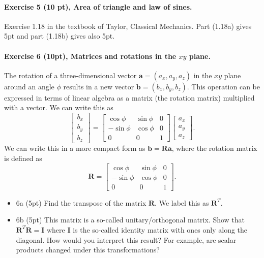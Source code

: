 \documentclass[%
oneside,                 %
final,                   %
10pt]{article}
\begin{document}
\noindent
\paragraph{Exercise 5 (10 pt), Area of triangle and law of sines.}
Exercise 1.18 in the textbook of Taylor, Classical Mechanics. Part (1.18a) gives 5pt and part (1.18b) gives also 5pt.

\paragraph{Exercise 6 (10pt), Matrices and rotations in the $xy$ plane.}
The rotation of a three-dimensional  vector $\bm{a}=(a_x,a_y,a_z)$ in the $xy$ plane around an angle $\phi$ results in a new vector $\bm{b}=(b_x,b_y,b_z)$.  This operation can be expressed in terms of linear algebra as a matrix (the rotation matrix) multiplied with a vector. We can write this as
\[
\begin{bmatrix} b_x \\ b_y \\ b_z \end{bmatrix} = \begin{bmatrix} \cos{\phi} & \sin{\phi} & 0 \\ -\sin{\phi} & \cos{\phi} & 0 \\ 0 & 0 & 1\end{bmatrix}\begin{bmatrix} a_x \\ a_y \\ a_z \end{bmatrix}.
\]
We can write this in a more compact form as $\bm{b} = \bm{R}\bm{a}$, where the rotation matrix is defined as
\[
\bm{R} = \begin{bmatrix} \cos{\phi} & \sin{\phi} & 0 \\ -\sin{\phi} & \cos{\phi} & 0 \\ 0 & 0 & 1\end{bmatrix}.
\]

\begin{itemize}
\item 6a (5pt) Find the transpose of the matrix $\bm{R}$. We label this as $\bm{R}^T$.

\item 6b (5pt)  This matrix is a so-called unitary/orthogonal matrix.  Show that $\bm{R}^T\bm{R}= \bm{I}$ where $\bm{I}$ is the so-called identity matrix with ones only along the diagonal. How would you interpret this result? For example, are scalar products changed under this transformations? 
\end{itemize}
\end{document}
